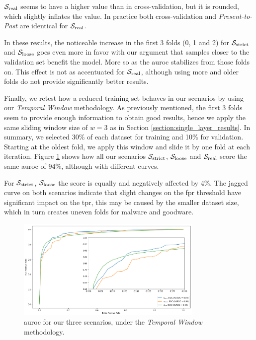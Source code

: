 $\mathcal{S}_{\mathrm{real}}$ seems to have a higher value than in cross-validation, but it is rounded, which slightly inflates the value.
In practice both cross-validation and \textit{Present-to-Past} are identical for $\mathcal{S}_{\mathrm{real}}$.

In these results, the noticeable increase in the first 3 folds (0, 1 and 2) for $\mathcal{S}_{\mathrm{strict}}$ and $\mathcal{S}_{\mathrm{loose}}$ goes even more in favor with our argument that samples closer to the validation set benefit the model.
More so as the \gls{auroc} stabilizes from those folds on.
This effect is not as accentuated for $\mathcal{S}_{\mathrm{real}}$, although using more and older folds do not provide significantly better results.

\medskip

Finally, we retest how a reduced training set behaves in our scenarios by using our \textit{Temporal Window} methodology.
As previously mentioned, the first 3 folds seem to provide enough information to obtain good results, hence we apply the same sliding window size of $w=3$ as in Section \ref{section:single_layer_results}.
In summary, we selected 30\% of each dataset for training and 10\% for validation.
Starting at the oldest fold, we apply this window and slide it by one fold at each iteration.
Figure \ref{fig:slidingwindow_modified} shows how all our scenarios $\mathcal{S}_{\mathrm{strict}}$, $\mathcal{S}_{\mathrm{loose}}$ and $\mathcal{S}_{\mathrm{real}}$ score the same \gls{auroc} of 94\%, although with different curves.

For $\mathcal{S}_{\mathrm{strict}}$, $\mathcal{S}_{\mathrm{loose}}$ the score is equally and negatively affected by 4\%.
The jagged curve on both scenarios indicate that slight changes on the \gls{fpr} threshold have significant impact on the \gls{tpr}, this may be caused by the smaller dataset size, which in turn creates uneven folds for malware and goodware.

\begin{figure}[!h]
	\centering
	\includegraphics[width=0.8\textwidth]{Figures/slidingwindow_improved.png}
	\caption[Multi layer results for dynamic features in \textit{Temporal Window}.]{\gls{auroc} for our three scenarios, under the \textit{Temporal Window} methodology.}
	\label{fig:slidingwindow_modified}
\end{figure}

